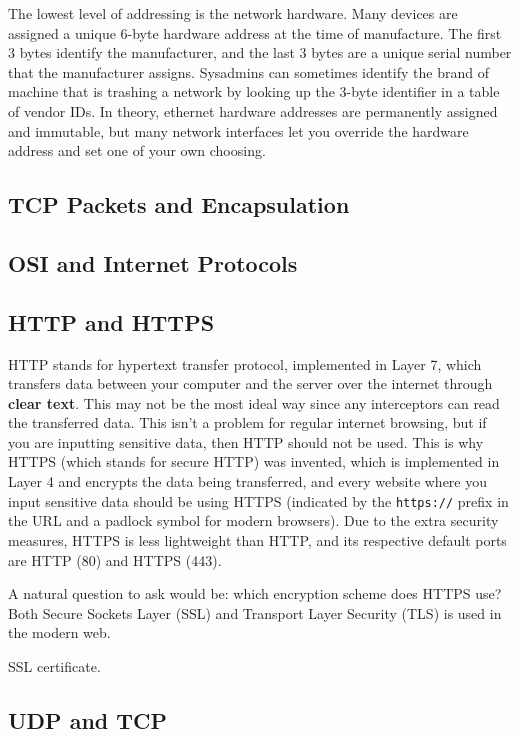 \documentclass{article}
\begin{document}
      The lowest level of addressing is the network hardware. Many devices are assigned a unique 6-byte hardware address at the time of manufacture. The first 3 bytes identify the manufacturer, and the last 3 bytes are a unique serial number that the manufacturer assigns. Sysadmins can sometimes identify the brand of machine that is trashing a network by looking up the 3-byte identifier in a table of vendor IDs. In theory, ethernet hardware addresses are permanently assigned and immutable, but many network interfaces let you override the hardware address and set one of your own choosing. 

  \subsection{TCP Packets and Encapsulation}

  \subsection{OSI and Internet Protocols}
  

  \subsection{HTTP and HTTPS} 

    HTTP stands for hypertext transfer protocol, implemented in Layer 7, which transfers data between your computer and the server over the internet through \textbf{clear text}. This may not be the most ideal way since any interceptors can read the transferred data. This isn't a problem for regular internet browsing, but if you are inputting sensitive data, then HTTP should not be used. This is why HTTPS (which stands for secure HTTP) was invented, which  is implemented in Layer 4 and encrypts the data being transferred, and every website where you input sensitive data should be using HTTPS (indicated by the \texttt{https://} prefix in the URL and a padlock symbol for modern browsers). Due to the extra security measures, HTTPS is less lightweight than HTTP, and its respective default ports are HTTP (80) and HTTPS (443).  

    A natural question to ask would be: which encryption scheme does HTTPS use? Both Secure Sockets Layer (SSL) and Transport Layer Security (TLS) is used in the modern web. 

    SSL certificate. 

    
  \subsection{UDP and TCP}
\end{document}
